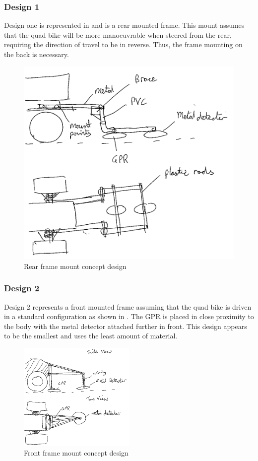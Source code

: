 \documentclass[main.tex]{subfiles}
\begin{document}
\subsubsection{Design 1}
Design one is represented in  and is a rear mounted frame. This mount assumes that the quad bike will be more manoeuvrable when steered from the rear, requiring the direction of travel to be in reverse. Thus, the frame mounting on the back is necessary. 
 \begin{figure}[ht]
 \includegraphics[width=.5\textwidth]{4-ConceptDesign/Rear_Mount.png}
 \centering
 \caption{Rear frame mount concept design}
 \end{figure}

\subsubsection{Design 2}
Design 2 represents a front mounted frame assuming that the quad bike is driven in a standard configuration as shown in . The GPR is placed in close proximity to the body with the metal detector attached further in front. This design appears to be the smallest and uses the least amount of material.
\begin{figure}[ht]
\includegraphics[width=0.5\textwidth]{4-ConceptDesign/front_frame_design_triangle.png}
\centering
\caption{Front frame mount concept design}
\end{figure}
\end{document}
